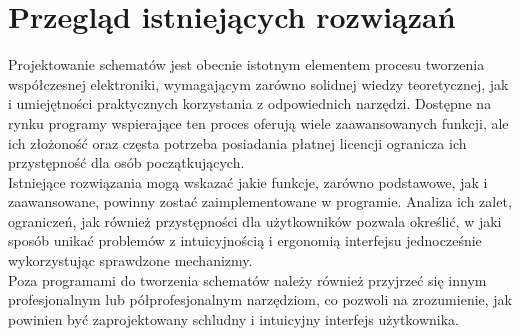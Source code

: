 \chapter{Przegląd istniejących rozwiązań}

Projektowanie schematów jest obecnie istotnym elementem procesu tworzenia współczesnej elektroniki,
wymagającym zarówno solidnej wiedzy teoretycznej, jak i umiejętności praktycznych korzystania z odpowiednich narzędzi.
Dostępne na rynku programy wspierające ten proces oferują wiele zaawansowanych funkcji,
ale ich złożoność oraz częsta potrzeba posiadania płatnej licencji ogranicza ich przystępność dla osób początkujących.\\
\indent Istniejące rozwiązania mogą wskazać jakie funkcje, zarówno podstawowe, jak i zaawansowane,
powinny zostać zaimplementowane w programie.
Analiza ich zalet, ograniczeń, jak również przystępności dla użytkowników pozwala określić,
w jaki sposób unikać problemów z intuicyjnością i ergonomią interfejsu jednocześnie wykorzystując sprawdzone mechanizmy.\\
\indent Poza programami do tworzenia schematów należy również przyjrzeć się innym profesjonalnym lub półprofesjonalnym narzędziom,
co pozwoli na zrozumienie, jak powinien być zaprojektowany schludny i intuicyjny interfejs użytkownika.



